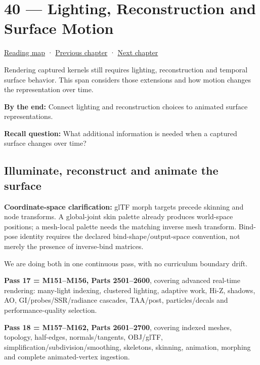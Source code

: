 \hypertarget{04-visual-computing-ii-ch040}{}
\chapter{40 --- Lighting, Reconstruction and Surface Motion}\label{04-visual-computing-ii-ch040-lighting-reconstruction-and-surface-motion}

\hyperref[volume-reading-map]{Reading map} · \hyperref[04-visual-computing-ii-ch039-tiling-ordering-and-compositing-at-scale]{Previous chapter} · \hyperref[04-visual-computing-ii-ch041-per-vertex-and-per-corner-mesh-attributes]{Next chapter}

Rendering captured kernels still requires lighting, reconstruction and temporal surface behavior. This span considers those extensions and how motion changes the representation over time.

\textbf{By the end:} Connect lighting and reconstruction choices to animated surface representations.

\textbf{Recall question:} What additional information is needed when a captured surface changes over time?

\section{Illuminate, reconstruct and animate the surface}\label{04-visual-computing-ii-ch040-illuminate-reconstruct-and-animate-the-surface}

\textbf{Coordinate-space clarification:} glTF morph targets precede skinning and node transforms. A global-joint skin palette already produces world-space positions; a mesh-local palette needs the matching inverse mesh transform. Bind-pose identity requires the declared bind-shape/output-space convention, not merely the presence of inverse-bind matrices.

We are doing both in one continuous pass, with no curriculum boundary drift.

\textbf{Pass 17 = M151--M156, Parts 2501--2600}, covering advanced real-time rendering: many-light indexing, clustered lighting, adaptive work, Hi-Z, shadows, AO, GI/probes/SSR/radiance cascades, TAA/post, particles/decals and performance-quality selection.

\textbf{Pass 18 = M157--M162, Parts 2601--2700}, covering indexed meshes, topology, half-edges, normals/tangents, OBJ/glTF, simplification/subdivision/smoothing, skeletons, skinning, animation, morphing and complete animated-vertex ingestion.

